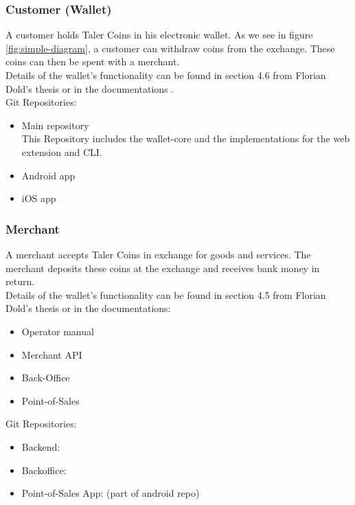 \subsubsection{Customer (Wallet)}
A customer holds Taler Coins in his electronic wallet.
As we see in figure \ref{fig:simple-diagram}, a customer can withdraw coins from the exchange.
These coins can then be spent with a merchant.
\\
Details of the wallet's functionality can be found in section 4.6 from Florian Dold's thesis \cite{dold:the-gnu-taler-system} or in the documentations \cite{taler-documentation:wallet-developer-manual} \cite{taler-documentation:wallet-cli-manual}.
\\
Git Repositories:
\begin{itemize}
    \item Main repository \cite{taler-git:wallet-core} \\
          This Repository includes the wallet-core and the implementations for the web extension and CLI.
    \item Android app \cite{taler-git:android}
    \item iOS app \cite{taler-git:ios}
\end{itemize}

\subsubsection{Merchant}
A merchant accepts Taler Coins in exchange for goods and services.
The merchant deposits these coins at the exchange and receives bank money in return.
\\
Details of the wallet's functionality can be found in section 4.5 from Florian Dold's thesis \cite{dold:the-gnu-taler-system} or in the documentations:
\begin{itemize}
    \item Operator manual \cite{taler-documentation:merchant-backend-operator-manual}
    \item Merchant API \cite{taler-documentation:merchant-api}
    \item Back-Office  \cite{taler-documentation:back-office}
    \item Point-of-Sales \cite{taler-documentation:pos-manual}
\end{itemize}

\noindent Git Repositories:
\begin{itemize}
    \item Backend: \cite{taler-git:merchant}
    \item Backoffice: \cite{taler-git:backoffice}
    \item Point-of-Sales App: \cite{taler-git:android} (part of android repo)
\end{itemize}


